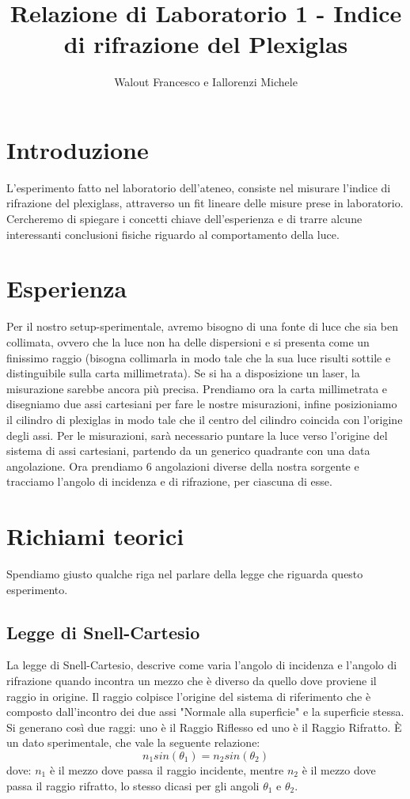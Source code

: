 \documentclass{article}
\title{Relazione di Laboratorio 1 - Indice di rifrazione del Plexiglas}
\author{Walout Francesco e Iallorenzi Michele}
\begin{document}
\maketitle

\section{Introduzione}
    L'esperimento fatto nel laboratorio dell'ateneo, consiste nel misurare l'indice di rifrazione del plexiglass, attraverso un fit lineare delle misure prese in laboratorio. Cercheremo di spiegare i concetti chiave dell'esperienza e di trarre alcune interessanti conclusioni fisiche riguardo al comportamento della luce.



\section{Esperienza}
    Per il nostro setup-sperimentale, avremo bisogno di una fonte di luce che sia ben collimata, ovvero che la luce non ha delle dispersioni e si presenta come un finissimo raggio (bisogna collimarla in modo tale che la sua luce risulti sottile e distinguibile sulla carta millimetrata). Se si ha a disposizione un laser, la misurazione sarebbe ancora più precisa.
    Prendiamo ora la carta millimetrata e disegniamo due assi cartesiani per fare le nostre misurazioni, infine posizioniamo il cilindro di plexiglas in modo tale che il centro del cilindro coincida con l'origine degli assi.
    Per le misurazioni, sarà necessario puntare la luce verso l'origine del sistema di assi cartesiani, partendo da un generico quadrante con una data angolazione. Ora prendiamo 6 angolazioni diverse della nostra sorgente e tracciamo l'angolo di incidenza e di rifrazione, per ciascuna di esse.

\section{Richiami teorici}
    Spendiamo giusto qualche riga nel parlare della legge che riguarda questo esperimento.

    \subsection{Legge di Snell-Cartesio}
        La legge di Snell-Cartesio, descrive come varia l'angolo di incidenza e l'angolo di rifrazione quando incontra un mezzo che è diverso da quello dove proviene il raggio in origine.
        Il raggio colpisce l'origine del sistema di riferimento che è composto dall'incontro dei due assi "Normale alla superficie" e la superficie stessa. Si generano così due raggi: uno è il Raggio Riflesso ed uno è il Raggio Rifratto. È un dato sperimentale, che vale la seguente relazione:
        \begin{equation}
            n_1 sin(\theta_1) = n_2 sin(\theta_2)
        \end{equation}
        dove: $n_1$ è il mezzo dove passa il raggio incidente, mentre $n_2$ è il mezzo dove passa il raggio rifratto, lo stesso dicasi per gli angoli $\theta_1$ e $\theta_2$.
\end{document}
